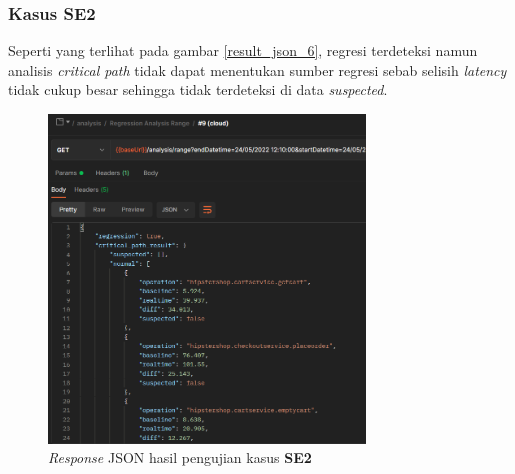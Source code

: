 \pagebreak

\subsubsection{Kasus SE2}
Seperti yang terlihat pada gambar \ref{result_json_6}, regresi terdeteksi namun analisis \textit{critical path} tidak dapat menentukan sumber regresi sebab selisih \textit{latency} tidak cukup besar sehingga tidak terdeteksi di data \textit{suspected}.
\begin{figure}[!htb]
	\centering
	\includegraphics[width=0.75\textwidth]{resources/ch4/json/9.png}
	\caption{\textit{Response} JSON hasil pengujian kasus \textbf{SE2}}
	\label{result_json_9}
\end{figure}

\pagebreak

